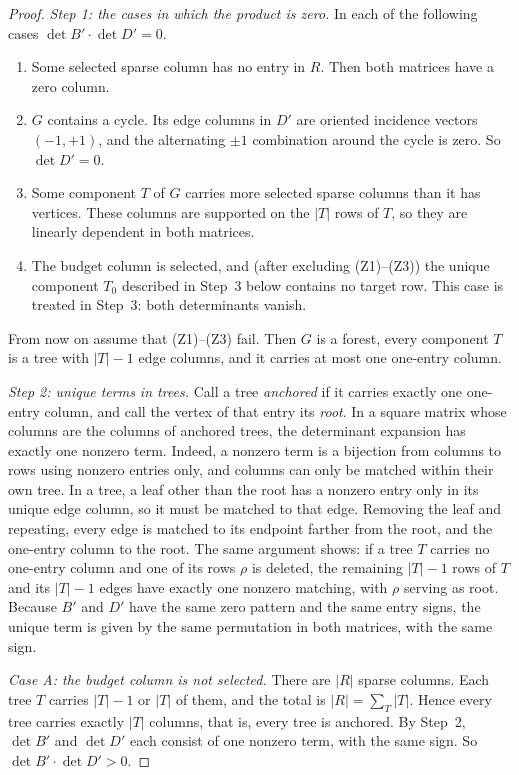 \begin{proof}
\emph{Step 1: the cases in which the product is zero.} In each of the following cases
$\det B'\cdot\det D'=0$.
\begin{enumerate}[label=(Z\arabic*),nosep]
  \item Some selected sparse column has no entry in $R$. Then both matrices have a zero column.
  \item $G$ contains a cycle. Its edge columns in $D'$ are oriented incidence vectors $(-1,+1)$, and
        the alternating $\pm1$ combination around the cycle is zero. So $\det D'=0$.
  \item Some component $T$ of $G$ carries more selected sparse columns than it has vertices. These
        columns are supported on the $|T|$ rows of $T$, so they are linearly dependent in both matrices.
  \item The budget column is selected, and (after excluding (Z1)--(Z3)) the unique component $T_0$
        described in Step~3 below contains no target row. This case is treated in Step~3: both
        determinants vanish.
\end{enumerate}
From now on assume that (Z1)--(Z3) fail. Then $G$ is a forest, every component $T$ is a tree with
$|T|-1$ edge columns, and it carries at most one one-entry column.

\emph{Step 2: unique terms in trees.} Call a tree \emph{anchored} if it carries exactly one one-entry
column, and call the vertex of that entry its \emph{root}. In a square matrix whose columns are the
columns of anchored trees, the determinant expansion has exactly one nonzero term. Indeed, a nonzero
term is a bijection from columns to rows using nonzero entries only, and columns can only be matched
within their own tree. In a tree, a leaf other than the root has a nonzero entry only in its unique edge
column, so it must be matched to that edge. Removing the leaf and repeating, every edge is matched to its
endpoint farther from the root, and the one-entry column to the root. The same argument shows: if a
tree $T$ carries no one-entry column and one of its rows $\rho$ is deleted, the remaining $|T|-1$ rows of
$T$ and its $|T|-1$ edges have exactly one nonzero matching, with $\rho$ serving as root. Because $B'$
and $D'$ have the same zero pattern and the same entry signs, the unique term is given by the same
permutation in both matrices, with the same sign.

\emph{Case A: the budget column is not selected.} There are $|R|$ sparse columns. Each tree $T$ carries
$|T|-1$ or $|T|$ of them, and the total is $|R|=\sum_T|T|$. Hence every tree carries exactly $|T|$
columns, that is, every tree is anchored. By Step~2, $\det B'$ and $\det D'$ each consist of one nonzero
term, with the same sign. So $\det B'\cdot\det D'>0$.


\end{proof}
